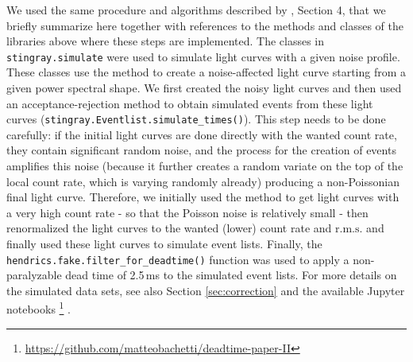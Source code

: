 \documentclass[twocolumn]{aastex61}
\newcommand{\rms}{\ensuremath{\mathrm{r.m.s.}}\xspace}
\begin{document}
We used the same procedure and algorithms described by \citet{Bachetti+15}, Section 4, that we briefly summarize here together with references to the methods and classes of the libraries above where these steps are implemented.
The classes in \texttt{stingray.simulate} were used to simulate light curves with a given noise profile. 
These classes use the \citet{timmer1995} method to create a noise-affected light curve starting from a given power spectral shape.
We first created the noisy light curves and then used an acceptance-rejection method to obtain simulated events from these light curves (\texttt{stingray.Eventlist.simulate\_times()}). 
This step needs to be done carefully: if the initial light curves are done directly with the wanted count rate, they contain significant random noise, and the process for the creation of events amplifies this noise (because it further creates a random variate on the top of the local count rate, which is varying randomly already) producing a non-Poissonian final light curve. 
Therefore, we initially used the \citet{timmer1995} method to get light curves with a very high count rate - so that the Poisson noise is relatively small - then renormalized the light curves to the wanted (lower) count rate and \rms and finally used these light curves to simulate event lists.
Finally, the \texttt{hendrics.fake.filter\_for\_deadtime()} function was used to apply a non-paralyzable dead time of 2.5\,ms to the simulated event lists. For more details on the simulated data sets, see also Section \ref{sec:correction} and the available Jupyter notebooks%
\footnote{\href{https://github.com/matteobachetti/deadtime-paper-II}{https://github.com/matteobachetti/deadtime-paper-II}} \citep[for a description of Jupyter notebooks, see][]{kluyver2016jupyter}.
\end{document}
